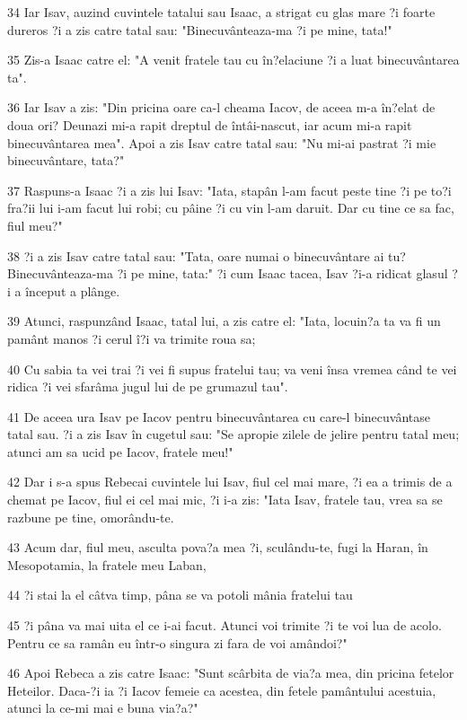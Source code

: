 \par 34 Iar Isav, auzind cuvintele tatalui sau Isaac, a strigat cu glas mare ?i foarte dureros ?i a zis catre tatal sau: "Binecuvânteaza-ma ?i pe mine, tata!"
\par 35 Zis-a Isaac catre el: "A venit fratele tau cu în?elaciune ?i a luat binecuvântarea ta".
\par 36 Iar Isav a zis: "Din pricina oare ca-l cheama Iacov, de aceea m-a în?elat de doua ori? Deunazi mi-a rapit dreptul de întâi-nascut, iar acum mi-a rapit binecuvântarea mea". Apoi a zis Isav catre tatal sau: "Nu mi-ai pastrat ?i mie binecuvântare, tata?"
\par 37 Raspuns-a Isaac ?i a zis lui Isav: "Iata, stapân l-am facut peste tine ?i pe to?i fra?ii lui i-am facut lui robi; cu pâine ?i cu vin l-am daruit. Dar cu tine ce sa fac, fiul meu?"
\par 38 ?i a zis Isav catre tatal sau: "Tata, oare numai o binecuvântare ai tu? Binecuvânteaza-ma ?i pe mine, tata:" ?i cum Isaac tacea, Isav ?i-a ridicat glasul ?i a început a plânge.
\par 39 Atunci, raspunzând Isaac, tatal lui, a zis catre el: "Iata, locuin?a ta va fi un pamânt manos ?i cerul î?i va trimite roua sa;
\par 40 Cu sabia ta vei trai ?i vei fi supus fratelui tau; va veni însa vremea când te vei ridica ?i vei sfarâma jugul lui de pe grumazul tau".
\par 41 De aceea ura Isav pe Iacov pentru binecuvântarea cu care-l binecuvântase tatal sau. ?i a zis Isav în cugetul sau: "Se apropie zilele de jelire pentru tatal meu; atunci am sa ucid pe Iacov, fratele meu!"
\par 42 Dar i s-a spus Rebecai cuvintele lui Isav, fiul cel mai mare, ?i ea a trimis de a chemat pe Iacov, fiul ei cel mai mic, ?i i-a zis: "Iata Isav, fratele tau, vrea sa se razbune pe tine, omorându-te.
\par 43 Acum dar, fiul meu, asculta pova?a mea ?i, sculându-te, fugi la Haran, în Mesopotamia, la fratele meu Laban,
\par 44 ?i stai la el câtva timp, pâna se va potoli mânia fratelui tau
\par 45 ?i pâna va mai uita el ce i-ai facut. Atunci voi trimite ?i te voi lua de acolo. Pentru ce sa ramân eu într-o singura zi fara de voi amândoi?"
\par 46 Apoi Rebeca a zis catre Isaac: "Sunt scârbita de via?a mea, din pricina fetelor Heteilor. Daca-?i ia ?i Iacov femeie ca acestea, din fetele pamântului acestuia, atunci la ce-mi mai e buna via?a?"

